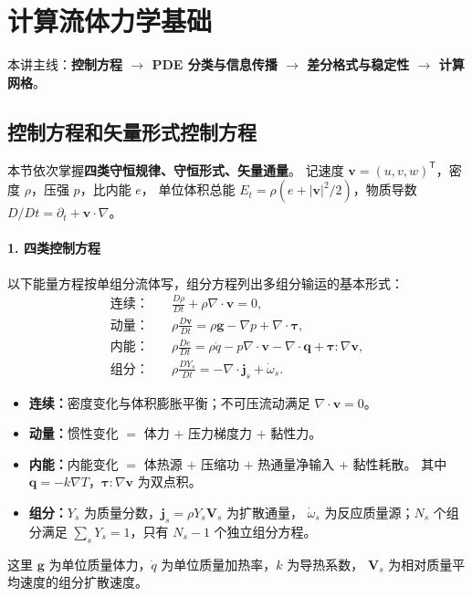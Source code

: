 \section{计算流体力学基础}
\label{sec:basics}
本讲主线：\textbf{控制方程 $\to$ PDE 分类与信息传播 $\to$ 差分格式与稳定性 $\to$ 计算网格}。

\subsection{控制方程和矢量形式控制方程}
\label{sec:cfd-equations}
本节依次掌握\textbf{四类守恒规律、守恒形式、矢量通量}。
记速度 $\mathbf v=(u,v,w)^{\mathsf T}$，密度 $\rho$，压强 $p$，比内能 $e$，
单位体积总能 $E_t=\rho(e+|\mathbf v|^2/2)$，物质导数
$D/Dt=\partial_t+\mathbf v\cdot\nabla$。

\paragraph{1. 四类控制方程}
以下能量方程按单组分流体写，组分方程列出多组分输运的基本形式：
\begin{align}
 \text{连续：}\quad&\frac{D\rho}{Dt}+\rho\nabla\cdot\mathbf v=0,\\
 \text{动量：}\quad&\rho\frac{D\mathbf v}{Dt}
       =\rho\mathbf g-\nabla p+\nabla\cdot\boldsymbol\tau,\\
 \text{内能：}\quad&\rho\frac{De}{Dt}
       =\rho\dot q-p\nabla\cdot\mathbf v-\nabla\cdot\mathbf q
        +\boldsymbol\tau:\nabla\mathbf v,\\
 \text{组分：}\quad&\rho\frac{DY_s}{Dt}
       =-\nabla\cdot\mathbf j_s+\dot\omega_s.
 \label{eq:cfd-material-laws}
\end{align}
\begin{itemize}
 \item \textbf{连续：}密度变化与体积膨胀平衡；不可压流动满足 $\nabla\cdot\mathbf v=0$。
 \item \textbf{动量：}惯性变化 $=$ 体力 $+$ 压力梯度力 $+$ 黏性力。
 \item \textbf{内能：}内能变化 $=$ 体热源 $+$ 压缩功 $+$ 热通量净输入 $+$ 黏性耗散。
       其中 $\mathbf q=-k\nabla T$，$\boldsymbol\tau:\nabla\mathbf v$ 为双点积。
 \item \textbf{组分：}$Y_s$ 为质量分数，$\mathbf j_s=\rho Y_s\mathbf V_s$ 为扩散通量，
       $\dot\omega_s$ 为反应质量源；$N_s$ 个组分满足 $\sum_sY_s=1$，只有 $N_s-1$ 个独立组分方程。
\end{itemize}
这里 $\mathbf g$ 为单位质量体力，$\dot q$ 为单位质量加热率，$k$ 为导热系数，
$\mathbf V_s$ 为相对质量平均速度的组分扩散速度。

